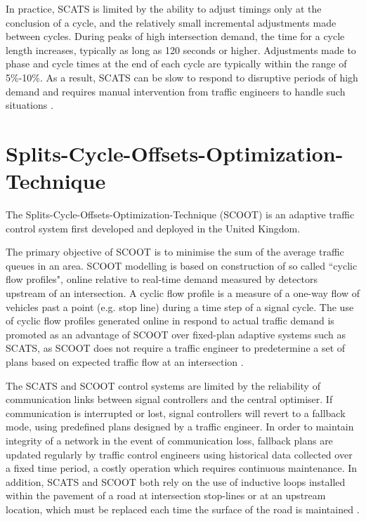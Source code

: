 In practice, SCATS is limited by the ability to adjust timings only at the conclusion of a cycle, and the relatively small incremental adjustments made between cycles. During peaks of high intersection demand, the time for a cycle length increases, typically as long as 120 seconds or higher. Adjustments made to phase and cycle times at the end of each cycle are typically within the range of 5\%-10\%. As a result, SCATS can be slow to respond to disruptive periods of high demand and requires manual intervention from traffic engineers to handle such situations \cite{scatstraining}.

\section{Splits-Cycle-Offsets-Optimization-Technique}

The Splits-Cycle-Offsets-Optimization-Technique (SCOOT) is an adaptive traffic control system first developed and deployed in the United Kingdom.

The primary objective of SCOOT is to minimise the sum of the average traffic queues in an area. SCOOT modelling is based on construction of so called ``cyclic flow profiles", online relative to real-time demand measured by detectors upstream of an intersection. A cyclic flow profile is a measure of a one-way flow of vehicles past a point (e.g. stop line) during a time step of a signal cycle. The use of cyclic flow profiles generated online in respond to actual traffic demand is promoted as an advantage of SCOOT over fixed-plan adaptive systems such as SCATS, as SCOOT does not require a traffic engineer to predetermine a set of plans based on expected traffic flow at an intersection \cite{bell1992future,robertson1991optimizing}.

The SCATS and SCOOT control systems are limited by the reliability of communication links between signal controllers and the central optimiser. If communication is interrupted or lost, signal controllers will revert to a fallback mode, using predefined plans designed by a traffic engineer. In order to maintain integrity of a network in the event of communication loss, fallback plans are updated regularly by traffic control engineers using historical data collected over a fixed time period, a costly operation which requires continuous maintenance. In addition, SCATS and SCOOT both rely on the use of inductive loops installed within the pavement of a road at intersection stop-lines or at an upstream location, which must be replaced each time the surface of the road is maintained  \cite{bell1992future}.

